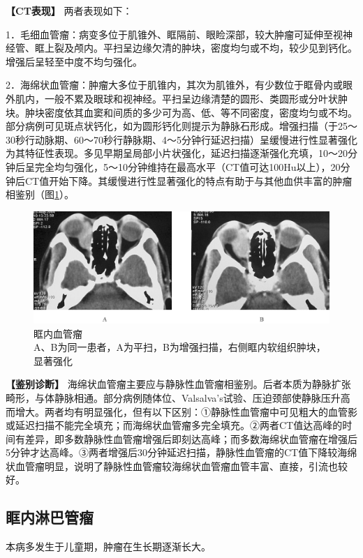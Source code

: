 \textbf{【CT表现】} 两者表现如下：

1．毛细血管瘤：病变多位于肌锥外、眶隔前、眼睑深部，较大肿瘤可延伸至视神经管、眶上裂及颅内。平扫呈边缘欠清的肿块，密度均匀或不均，较少见到钙化。增强后呈轻至中度不均匀强化。

2．海绵状血管瘤：肿瘤大多位于肌锥内，其次为肌锥外，有少数位于眶骨内或眼外肌内，一般不累及眼球和视神经。平扫呈边缘清楚的圆形、类圆形或分叶状肿块。肿块密度依其血窦和间质的多少可为高、低、等不同密度，密度均匀或不均。部分病例可见斑点状钙化，如为圆形钙化则提示为静脉石形成。增强扫描（于25～30秒行动脉期、60～70秒行静脉期、4～5分钟行延迟扫描）呈缓慢进行性显著强化为其特征性表现。多见早期呈局部小片状强化，延迟扫描逐渐强化充填，10～20分钟后呈完全均匀强化，5～10分钟维持在最高水平（CT值可达100Hu以上），20分钟后CT值开始下降。其缓慢进行性显著强化的特点有助于与其他血供丰富的肿瘤相鉴别（图\ref{fig3-7}）。

\begin{figure}[!htbp]
 \centering
 \includegraphics[width=.7\textwidth,height=\textheight,keepaspectratio]{./images/Image00106.jpg}
 \captionsetup{justification=centering}
 \caption{眶内血管瘤\\{\small A、B为同一患者，A为平扫，B为增强扫描，右侧眶内软组织肿块，显著强化}}
 \label{fig3-7}
  \end{figure} 

\textbf{【鉴别诊断】}
海绵状血管瘤主要应与静脉性血管瘤相鉴别。后者本质为静脉扩张畸形，与体静脉相通。部分病例随体位、Valsalva's试验、压迫颈部使静脉压升高而增大。两者均有明显强化，但有以下区别：①静脉性血管瘤中可见粗大的血管影或延迟扫描不能完全填充；而海绵状血管瘤多完全填充。②两者CT值达高峰的时间有差异，即多数静脉性血管瘤增强后即刻达高峰；而多数海绵状血管瘤在增强后5分钟才达高峰。③两者增强后30分钟延迟扫描，静脉性血管瘤的CT值下降较海绵状血管瘤明显，说明了静脉性血管瘤较海绵状血管瘤血管丰富、直接，引流也较好。

\subsection{眶内淋巴管瘤}

本病多发生于儿童期，肿瘤在生长期逐渐长大。

